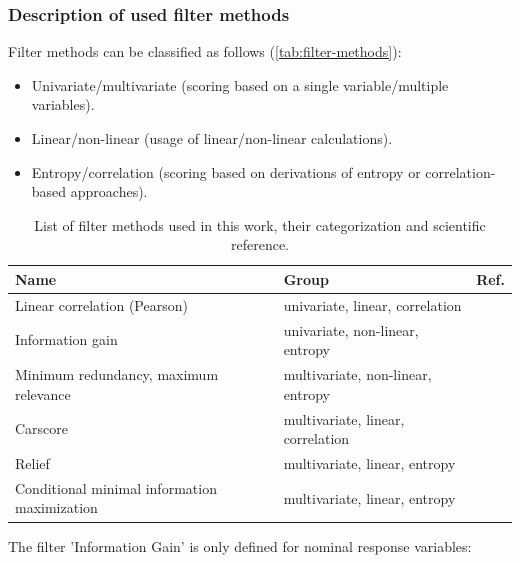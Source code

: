 \documentclass[remotesensing,article,submit,moreauthors,pdftex]{Definitions/mdpi}
\begin{document}
\subsubsection{Description of used filter methods}

Filter methods can be classified as follows (\autoref{tab:filter-methods}):

\begin{itemize}
	\item Univariate/multivariate (scoring based on a single variable/multiple variables).
	\item Linear/non-linear (usage of linear/non-linear calculations).
	\item Entropy/correlation (scoring based on derivations of entropy or correlation-based approaches).
\end{itemize}

\begin{table}[b!]
	\centering
	\caption{List of filter methods used in this work, their categorization and scientific reference.}
	\label{tab:filter-methods}
	\begingroup\footnotesize
	\begin{adjustbox}{width={0.7\textwidth},totalheight={\textheight},keepaspectratio}
		\begin{tabular}{lll}
			\\
			Name                                         & Group                             & Ref.               \\
			\toprule
			Linear correlation (Pearson)                 & univariate, linear, correlation   & \cite{pearson1901} \\
			Information gain                             & univariate, non-linear, entropy   & \cite{quinlan1986} \\
			Minimum redundancy, maximum relevance        & multivariate, non-linear, entropy & \cite{zhao2013}    \\
			Carscore                                     & multivariate, linear, correlation & \cite{zuber2011}   \\
			Relief                                       & multivariate, linear, entropy     & \cite{kira1992}    \\
			Conditional minimal information maximization & multivariate, linear, entropy     & \cite{fleuret2004}
		\end{tabular}
	\end{adjustbox}
	\endgroup
\end{table}

The filter 'Information Gain' is only defined for nominal response variables:
\end{document}
